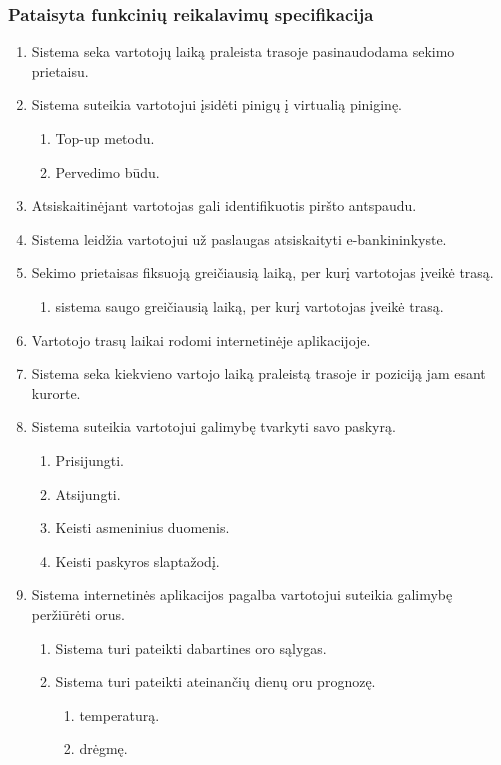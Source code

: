 \documentclass[oneside]{VUMIFPSkursinis}
\begin{document}
\subsubsection{Pataisyta funkcinių reikalavimų specifikacija}
\begin{enumerate}
	\item Sistema seka vartotojų laiką praleista trasoje pasinaudodama sekimo prietaisu.
	\item Sistema suteikia vartotojui įsidėti pinigų į virtualią piniginę.
	\begin{enumerate}
		\item Top-up metodu.
		\item Pervedimo būdu.
	\end{enumerate}
	\item Atsiskaitinėjant vartotojas gali identifikuotis piršto antspaudu.
	\item Sistema leidžia vartotojui už paslaugas atsiskaityti e-bankininkyste.
	\item Sekimo prietaisas fiksuoją greičiausią laiką, per kurį vartotojas įveikė trasą.
	\begin{enumerate}
		\item sistema saugo greičiausią laiką, per kurį vartotojas įveikė trasą.
	\end{enumerate}
	\item Vartotojo trasų laikai rodomi internetinėje aplikacijoje.
	\item Sistema seka kiekvieno vartojo laiką praleistą trasoje ir poziciją jam esant kurorte.
	\item Sistema suteikia vartotojui galimybę tvarkyti savo paskyrą.
	\begin{enumerate}
		\item Prisijungti.
		\item Atsijungti.
		\item Keisti asmeninius duomenis.
		\item Keisti paskyros slaptažodį.
	\end{enumerate}
	\item Sistema internetinės aplikacijos pagalba vartotojui suteikia galimybę peržiūrėti orus.
	\begin{enumerate}
		\item Sistema turi pateikti dabartines oro sąlygas.
		\item Sistema turi pateikti ateinančių dienų oru prognozę.
		\begin{enumerate}
			\item temperaturą.
			\item drėgmę.

\end{enumerate}
\end{enumerate}
\end{enumerate}
\end{document}
